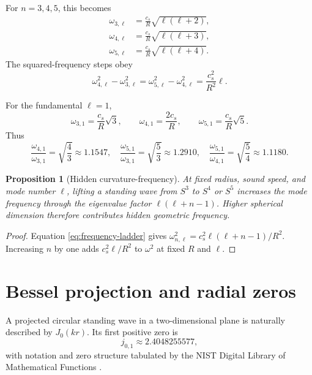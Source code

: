 \documentclass[11pt]{article}
\newtheorem{proposition}{Proposition}
\begin{document}
For $n=3,4,5$, this becomes
\begin{align}
 \omega_{3,\ell}&=\frac{c_s}{R}\sqrt{\ell(\ell+2)},\\
 \omega_{4,\ell}&=\frac{c_s}{R}\sqrt{\ell(\ell+3)},\\
 \omega_{5,\ell}&=\frac{c_s}{R}\sqrt{\ell(\ell+4)}.
\end{align}
The squared-frequency steps obey
\begin{equation}
 \omega_{4,\ell}^2-\omega_{3,\ell}^2
 =\omega_{5,\ell}^2-\omega_{4,\ell}^2
 =\frac{c_s^2}{R^2}\ell.
 \label{eq:squared-frequency-ladder}
\end{equation}

For the fundamental $\ell=1$,
\begin{equation}
 \omega_{3,1}=\frac{c_s}{R}\sqrt{3},\qquad
 \omega_{4,1}=\frac{2c_s}{R},\qquad
 \omega_{5,1}=\frac{c_s}{R}\sqrt{5}.
\end{equation}
Thus
\begin{equation}
 \frac{\omega_{4,1}}{\omega_{3,1}}=\sqrt{\frac43}\approx1.1547,
 \quad
 \frac{\omega_{5,1}}{\omega_{3,1}}=\sqrt{\frac53}\approx1.2910,
 \quad
 \frac{\omega_{5,1}}{\omega_{4,1}}=\sqrt{\frac54}\approx1.1180.
\end{equation}

\begin{proposition}[Hidden curvature-frequency]
At fixed radius, sound speed, and mode number $\ell$, lifting a standing wave from $S^3$ to $S^4$ or $S^5$ increases the mode frequency through the eigenvalue factor $\ell(\ell+n-1)$.  Higher spherical dimension therefore contributes hidden geometric frequency.
\end{proposition}

\begin{proof}
Equation \eqref{eq:frequency-ladder} gives $\omega_{n,\ell}^2=c_s^2\ell(\ell+n-1)/R^2$.  Increasing $n$ by one adds $c_s^2\ell/R^2$ to $\omega^2$ at fixed $R$ and $\ell$.
\end{proof}

\section{Bessel projection and radial zeros}

A projected circular standing wave in a two-dimensional plane is naturally described by $J_0(kr)$.  Its first positive zero is
\begin{equation}
 j_{0,1}\approx2.4048255577,
\end{equation}
with notation and zero structure tabulated by the NIST Digital Library of Mathematical Functions \citep{DLMFBesselZeros}.
\end{document}
